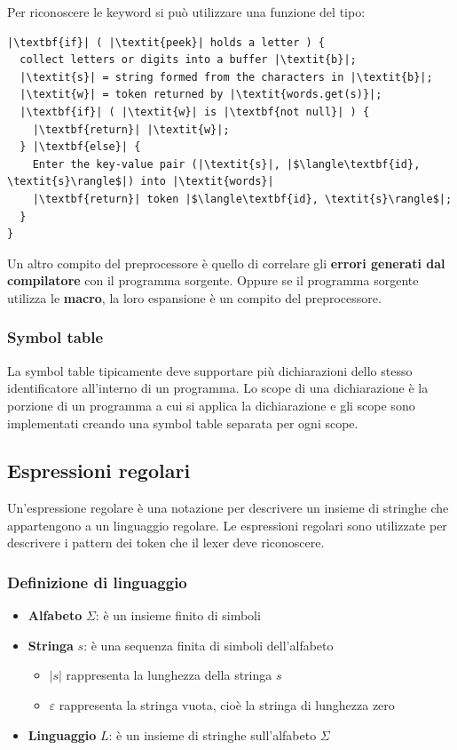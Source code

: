\documentclass[a4paper]{article}
\begin{document}
\vspace{1em}
\noindent
\begin{example}
  Per riconoscere le keyword si può utilizzare una funzione del tipo:
\begin{lstlisting}[escapechar=|, basicstyle=\rmfamily, columns=fullflexible, keepspaces=true]
|\textbf{if}| ( |\textit{peek}| holds a letter ) {
  collect letters or digits into a buffer |\textit{b}|;
  |\textit{s}| = string formed from the characters in |\textit{b}|;
  |\textit{w}| = token returned by |\textit{words.get(s)}|;
  |\textbf{if}| ( |\textit{w}| is |\textbf{not null}| ) {
    |\textbf{return}| |\textit{w}|;
  } |\textbf{else}| {
    Enter the key-value pair (|\textit{s}|, |$\langle\textbf{id}, \textit{s}\rangle$|) into |\textit{words}|
    |\textbf{return}| token |$\langle\textbf{id}, \textit{s}\rangle$|;
  }
}
\end{lstlisting}
\end{example}

\noindent
Un altro compito del preprocessore è quello di correlare gli \textbf{errori generati
dal compilatore} con il programma sorgente. Oppure se il programma sorgente utilizza
le \textbf{macro}, la loro espansione è un compito del preprocessore.

\subsubsection{Symbol table}
La symbol table tipicamente deve supportare più dichiarazioni dello stesso
identificatore all'interno di un programma. Lo scope di una dichiarazione è
la porzione di un programma a cui si applica la dichiarazione e gli scope sono
implementati creando una symbol table separata per ogni scope.

\subsection{Espressioni regolari}
Un'espressione regolare è una notazione per descrivere un insieme di stringhe che
appartengono a un linguaggio regolare. Le espressioni regolari sono utilizzate per
descrivere i pattern dei token che il lexer deve riconoscere.

\subsubsection{Definizione di linguaggio}
\begin{itemize}
  \item \textbf{Alfabeto} \( \Sigma  \): è un insieme finito di simboli
  \item \textbf{Stringa} \( s \): è una sequenza finita di simboli dell'alfabeto
    \begin{itemize}
      \item \( |s| \) rappresenta la lunghezza della stringa \( s \)
      \item \( \varepsilon \) rappresenta la stringa vuota, cioè la stringa
        di lunghezza zero
    \end{itemize}
  \item \textbf{Linguaggio} \( L \): è un insieme di stringhe sull'alfabeto \( \Sigma \)
\end{itemize}
\end{document}
